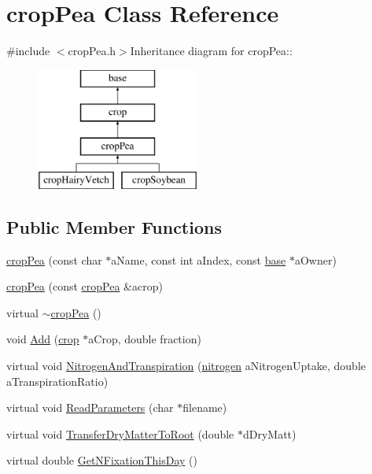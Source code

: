 \hypertarget{classcrop_pea}{
\section{cropPea Class Reference}
\label{classcrop_pea}
}


{\ttfamily \#include $<$cropPea.h$>$}Inheritance diagram for cropPea::\begin{figure}[H]
\begin{center}
\leavevmode
\includegraphics[height=4cm]{classcrop_pea}
\end{center}
\end{figure}
\subsection*{Public Member Functions}
\begin{DoxyCompactItemize}
\item 
\hyperlink{classcrop_pea_a99687d96732363431a8f6bc474ac1773}{cropPea} (const char $\ast$aName, const int aIndex, const \hyperlink{classbase}{base} $\ast$aOwner)
\item 
\hyperlink{classcrop_pea_a00017b07f1e047f3af5e170497298180}{cropPea} (const \hyperlink{classcrop_pea}{cropPea} \&acrop)
\item 
virtual \hyperlink{classcrop_pea_aec7823ced622eb52b0de4e637ab03edd}{$\sim$cropPea} ()
\item 
void \hyperlink{classcrop_pea_ac56e0664c618ab5e8ead80d2259a02a8}{Add} (\hyperlink{classcrop}{crop} $\ast$aCrop, double fraction)
\item 
virtual void \hyperlink{classcrop_pea_a2e984c9df88d272f2caade355a36fff7}{NitrogenAndTranspiration} (\hyperlink{classnitrogen}{nitrogen} aNitrogenUptake, double aTranspirationRatio)
\item 
virtual void \hyperlink{classcrop_pea_a95c81e1e9ce7479013fac70b8e4cee86}{ReadParameters} (char $\ast$filename)
\item 
virtual void \hyperlink{classcrop_pea_acd369e049225726674bcc0091f2f9e54}{TransferDryMatterToRoot} (double $\ast$dDryMatt)
\item 
virtual double \hyperlink{classcrop_pea_ac337615ba724c897a369dd1ad85a951e}{GetNFixationThisDay} ()
\end{DoxyCompactItemize}
